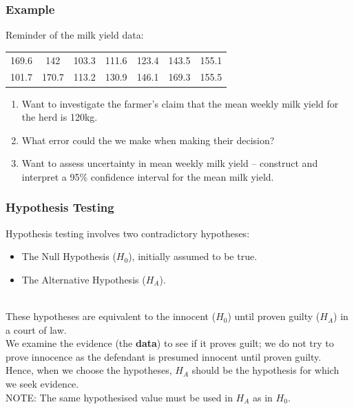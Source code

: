 \documentclass[12pt,xcolor=dvipsnames,handout,mathserif,aspectratio=169]{beamer}
\newcommand{\bbl}[1]{{\color{NavyBlue} \textbf{#1}}}
\begin{document}
\begin{frame}\frametitle{Example}
Reminder of the milk yield data: \\
\vspace{0.5cm}
\begin{tabular}{ccccccc}
169.6&142&103.3&111.6&123.4&143.5&155.1\\
101.7&170.7&113.2&130.9&146.1&169.3&155.5
\end{tabular}
\vspace{0.5cm}

\begin{enumerate}
\item Want to investigate the farmer's claim that the mean weekly milk yield for the herd is 120kg.
\vspace{0.2cm}
\item What error could the we make when making their decision?
\vspace{0.2cm}
\item Want to assess uncertainty in mean weekly milk yield -- construct and interpret a 95\% confidence interval for the mean milk yield.
\end{enumerate}

\end{frame}

\begin{frame}
\frametitle{Hypothesis Testing}
Hypothesis testing involves two contradictory hypotheses:
\begin{itemize}
\item The Null Hypothesis ($H_0$), initially assumed to be true.
\item The Alternative Hypothesis ($H_A$).
\end{itemize}
$\:$\\
These hypotheses are equivalent to the innocent ($H_0$) until proven guilty ($H_A$) in a court of law. \\
\vspace*{0.4cm}
We examine the evidence (the \bbl{data}) to see if it proves guilt; we do not try to prove innocence as the defendant is presumed innocent until proven guilty. \\
\vspace*{0.4cm}
Hence, when we choose the hypotheses, $H_A$ should be the hypothesis for which we seek evidence.\\
\vspace*{0.4cm}
NOTE: The same hypothesised value must be used in $H_A$ as in $H_0$.
\end{frame}
\end{document}
